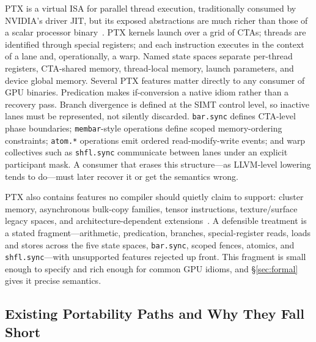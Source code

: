 \documentclass[sigplan,nonacm]{acmart}
\begin{document}
PTX is a virtual ISA for parallel thread execution, traditionally consumed by
NVIDIA's driver JIT, but its exposed abstractions are much richer than those
of a scalar processor binary~\cite{nvidia_ptx_isa_93,nvidia_cuda_platform}.
PTX kernels launch over a grid of CTAs; threads are identified through
special registers; and each instruction executes in the context of a lane and,
operationally, a warp.  Named state spaces separate per-thread registers,
CTA-shared memory, thread-local memory, launch parameters, and device global
memory.  Several PTX features matter directly to any consumer of GPU
binaries.  Predication makes if-conversion a native idiom rather than a
recovery pass.  Branch divergence is defined at the SIMT control level, so
inactive lanes must be represented, not silently discarded.  \texttt{bar.sync}
defines CTA-level phase boundaries; \texttt{membar}-style operations define
scoped memory-ordering constraints; \texttt{atom.*} operations emit ordered
read-modify-write events; and warp collectives such as \texttt{shfl.sync}
communicate between lanes under an explicit participant mask.  A consumer
that erases this structure---as LLVM-level lowering tends to do---must later
recover it or get the semantics wrong.

PTX also contains features no compiler should quietly claim to support:
cluster memory, asynchronous bulk-copy families, tensor instructions,
texture/surface legacy spaces, and architecture-dependent
extensions~\cite{nvidia_ptx_isa_93}.  A defensible treatment is a stated
fragment---arithmetic, predication, branches, special-register reads, loads
and stores across the five state spaces, \texttt{bar.sync}, scoped fences,
atomics, and \texttt{shfl.sync}---with unsupported features rejected up
front.  This fragment is small enough to specify and rich enough for common
GPU idioms, and \S\ref{sec:formal} gives it precise semantics.

\subsection{Existing Portability Paths and Why They Fall Short}
\label{sec:existing}
\end{document}
